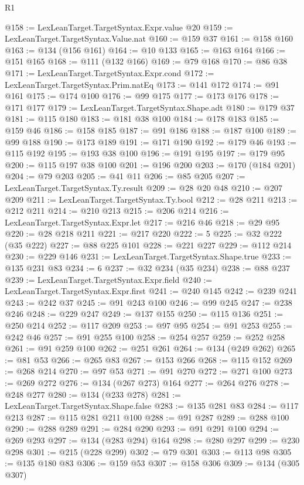 \begin{lexlean}{R1}
\begin{coremodule}
@158 := LexLeanTarget.TargetSyntax.Expr.value @20
@159 := LexLeanTarget.TargetSyntax.Value.nat
@160 := @159 @37
@161 := @158 @160
@163 := @134 (@156 @161)
@164 := @10 @133
@165 := @163 @164
@166 := @151 @165
@168 := @111 (@132 @166)
@169 := @79 @168
@170 := @86 @38
@171 := LexLeanTarget.TargetSyntax.Expr.cond
@172 := LexLeanTarget.TargetSyntax.Prim.natEq
@173 := @141 @172
@174 := @91 @161
@175 := @174 @100
@176 := @99 @175
@177 := @173 @176
@178 := @171 @177
@179 := LexLeanTarget.TargetSyntax.Shape.adt
@180 := @179 @37
@181 := @115 @180
@183 := @181 @38 @100
@184 := @178 @183
@185 := @159 @46
@186 := @158 @185
@187 := @91 @186
@188 := @187 @100
@189 := @99 @188
@190 := @173 @189
@191 := @171 @190
@192 := @179 @46
@193 := @115 @192
@195 := @193 @38 @100
@196 := @191 @195
@197 := @179 @95
@200 := @115 @197 @38 @100
@201 := @196 @200
@203 := @170 (@184 @201)
@204 := @79 @203
@205 := @41 @11
@206 := @85 @205
@207 := LexLeanTarget.TargetSyntax.Ty.result
@209 := @28 @20 @48
@210 := @207 @209
@211 := LexLeanTarget.TargetSyntax.Ty.bool
@212 := @28 @211
@213 := @212 @211
@214 := @210 @213
@215 := @206 @214
@216 := LexLeanTarget.TargetSyntax.Expr.let
@217 := @216 @46
@218 := @29 @95
@220 := @28 @218 @211
@221 := @217 @220
@222 := 5
@225 := @32 @222 (@35 @222)
@227 := @88 @225 @101
@228 := @221 @227
@229 := @112 @214
@230 := @229 @146
@231 := LexLeanTarget.TargetSyntax.Shape.true
@233 := @135 @231 @83
@234 := 6
@237 := @32 @234 (@35 @234)
@238 := @88 @237
@239 := LexLeanTarget.TargetSyntax.Expr.field
@240 := LexLeanTarget.TargetSyntax.Expr.first
@241 := @240 @145
@242 := @239 @241
@243 := @242 @37
@245 := @91 @243 @100
@246 := @99 @245
@247 := @238 @246
@248 := @229 @247
@249 := @137 @155
@250 := @115 @136
@251 := @250 @214
@252 := @117 @209
@253 := @97 @95
@254 := @91 @253
@255 := @242 @46
@257 := @91 @255 @100
@258 := @254 @257
@259 := @252 @258
@261 := @91 @259 @100
@262 := @251 @261
@264 := @134 (@249 @262)
@265 := @81 @53
@266 := @265 @83
@267 := @153 @266
@268 := @115 @152
@269 := @268 @214
@270 := @97 @53
@271 := @91 @270
@272 := @271 @100
@273 := @269 @272
@276 := @134 (@267 @273) @164
@277 := @264 @276
@278 := @248 @277
@280 := @134 (@233 @278)
@281 := LexLeanTarget.TargetSyntax.Shape.false
@283 := @135 @281 @83
@284 := @117 @213
@287 := @115 @281 @211 @100
@288 := @91 @287
@289 := @288 @100
@290 := @288 @289
@291 := @284 @290
@293 := @91 @291 @100
@294 := @269 @293
@297 := @134 (@283 @294) @164
@298 := @280 @297
@299 := @230 @298
@301 := @215 (@228 @299)
@302 := @79 @301
@303 := @113 @98
@305 := @135 @180 @83
@306 := @159 @53
@307 := @158 @306
@309 := @134 (@305 @307)

\end{coremodule}
\end{lexlean}
